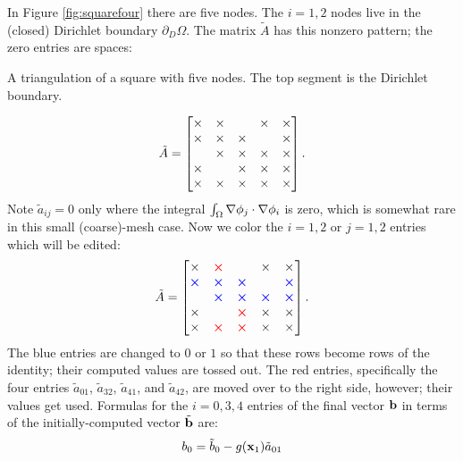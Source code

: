 \medskip\noindent\hrulefill
\begin{example} In Figure \ref{fig:squarefour} there are five nodes.  The $i=1,2$ nodes live in the (closed) Dirichlet boundary $\partial_D \Omega$.  The matrix $\tilde A$ has this nonzero pattern; the zero entries are spaces:\begin{marginfigure}

\caption{A triangulation of a square with five nodes.  The top segment is the Dirichlet boundary.}
\label{fig:squarefour}
\end{marginfigure}%
\begin{equation*}
\tilde A = \begin{bmatrix}
\times & \times &    & \times & \times \\
\times & \times & \times &    & \times \\
   & \times & \times & \times & \times \\
\times &    & \times & \times & \times \\
\times & \times & \times & \times & \times
\end{bmatrix}.
\end{equation*}
Note $\tilde a_{ij}=0$ only where the integral $\int_\Omega \nabla \phi_j \cdot \nabla \phi_i$ is zero, which is somewhat rare in this small (coarse)-mesh case.  Now we color the $i=1,2$ or $j=1,2$ entries which will be edited:
\begin{equation*}
\tilde A = \begin{bmatrix}
\times & {\color{red} \bm{\times}} &    & \times & \times \\
{\color{blue} \bm{\times}} & {\color{blue} \bm{\times}} & {\color{blue} \bm{\times}} &    & {\color{blue} \bm{\times}} \\
   & {\color{blue} \bm{\times}} & {\color{blue} \bm{\times}} & {\color{blue} \bm{\times}} & {\color{blue} \bm{\times}} \\
\times &    & {\color{red} \bm{\times}} & \times & \times \\
\times & {\color{red} \bm{\times}} & {\color{red} \bm{\times}} & \times & \times
\end{bmatrix}.
\end{equation*}
The {\color{blue} blue} entries are changed to $0$ or $1$ so that these rows become rows of the identity; their computed values are tossed out.  The {\color{red} red} entries, specifically the four entries $\tilde a_{01}$, $\tilde a_{32}$, $\tilde a_{41}$, and $\tilde a_{42}$, are moved over to the right side, however; their values get used.  Formulas for the $i=0,3,4$ entries of the final vector $\mathbf{b}$ in terms of the initially-computed vector $\tilde{\mathbf{b}}$ are:
\begin{align*}
b_0 &= \tilde b_0 - g(\bx_1) \tilde a_{01} \\

\end{align*}
\end{example}
